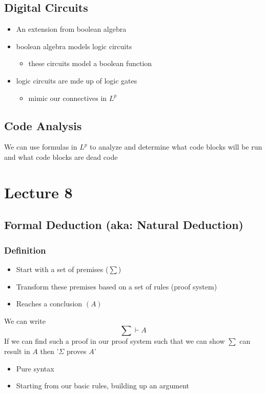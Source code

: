 \documentclass[11pt]{article}
\begin{document}
\subsection{Digital Circuits}
\begin{itemize}
    \item An extension from boolean algebra 
    \item boolean algebra models logic circuits 
    \begin{itemize}
        \item these circuits model a boolean function
    \end{itemize}
    \item logic circuits are mde up of logic gates
    \begin{itemize}
        \item mimic our connectives in $L^p$
    \end{itemize}
\end{itemize}
\begin{minipage}[t]{\linewidth}
\end{minipage}
\begin{minipage}[t]{\linewidth}
\end{minipage}
\subsection{Code Analysis}
We can use formulas in $L^p$ to analyze and determine what code blocks will be run and what code blocks are dead code

\section{Lecture 8}
\subsection{Formal Deduction (aka: Natural Deduction)}
\subsubsection{Definition}
\begin{itemize}
    \item Start with a set of premises ($\sum$)
    \item Transform these premises based on a set of rules (proof system)
    \item Reaches a conclusion $(A)$
\end{itemize}
We can write \[\sum\vdash A\]
If we can find such a proof in our proof system such that we can show $\sum$ can result in $A$ then '$\Sigma$ proves $A$'
\begin{itemize}
    \item Pure syntax 
    \item Starting from our basic rules, building up an argument 
\end{itemize}
\end{document}
